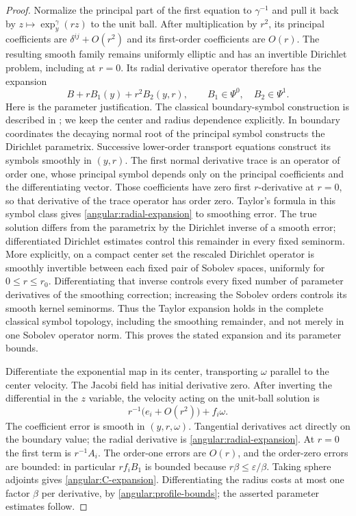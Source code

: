 \documentclass[11pt]{article}
\theoremstyle{definition}
\theoremstyle{remark}
\newcommand{\eps}{\varepsilon}
\numberwithin{equation}{section}
\begin{document}
\begin{proof}
Normalize the principal part of the first equation to $\gamma^{-1}$ and
pull it back by $z\mapsto\exp_y^\gamma(rz)$ to the unit ball.  After
multiplication by $r^2$, its principal coefficients are
$\delta^{ij}+O(r^2)$ and its first-order coefficients are $O(r)$.
The resulting smooth family remains uniformly elliptic and has an
invertible Dirichlet problem, including at $r=0$.  Its radial derivative
operator therefore has the expansion
\begin{equation}\label{angular:radial-expansion}
 B+r B_1(y)+r^2 B_2(y,r),\qquad
 B_1\in\Psi^0,\quad B_2\in\Psi^1.
\end{equation}
Here is the parameter justification.  The classical boundary-symbol
construction is described in
\citep[Theorem~1.1(i) and Proposition~3.1]{JoshiLionheart2005};
we keep the center and radius dependence explicitly.
In boundary coordinates the decaying
normal root of the principal symbol constructs the Dirichlet parametrix.
Successive lower-order transport equations construct its symbols smoothly
in $(y,r)$.  The first normal derivative trace is an operator of order one,
whose principal symbol depends only on the principal coefficients and the
differentiating vector.  Those coefficients have zero first $r$-derivative
at $r=0$, so that derivative of the trace operator has order zero.  Taylor's
formula in this symbol class gives \eqref{angular:radial-expansion} to
smoothing error.  The true solution differs from the parametrix by the
Dirichlet inverse of a smooth error; differentiated Dirichlet estimates
control this remainder in every fixed seminorm.  More explicitly, on a
compact center set the rescaled Dirichlet operator is smoothly
invertible between each fixed pair of Sobolev spaces, uniformly for
$0\le r\le r_0$.  Differentiating that inverse controls every fixed
number of parameter derivatives of the smoothing correction; increasing
the Sobolev orders controls its smooth kernel seminorms.  Thus the
Taylor expansion holds in the complete classical symbol topology,
including the smoothing remainder, and not merely in one Sobolev
operator norm.  This proves the stated expansion and its parameter bounds.

Differentiate the exponential map in its center, transporting $\omega$
parallel to the center velocity.  The Jacobi field has initial derivative
zero.  After inverting the differential in the $z$ variable, the velocity
acting on the unit-ball solution is
\[
 r^{-1}\bigl(e_i+O(r^2)\bigr)+f_i\omega.
\]
The coefficient error is smooth in $(y,r,\omega)$.  Tangential derivatives
act directly on the boundary value; the radial derivative is
\eqref{angular:radial-expansion}.  At $r=0$ the first term is $r^{-1}A_i$.
The order-one errors are $O(r)$, and the order-zero errors are bounded:
in particular $r f_i B_1$ is bounded because $r\beta\le\eps/\beta$.
Taking sphere adjoints gives \eqref{angular:C-expansion}.  Differentiating
the radius costs at most one factor $\beta$ per derivative, by
\eqref{angular:profile-bounds}; the asserted parameter estimates follow.


\end{proof}
\end{document}
